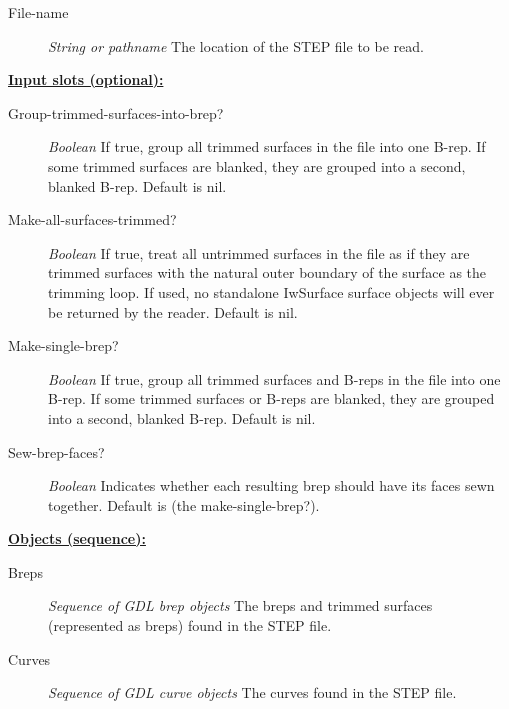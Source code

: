 \documentclass [11pt]{book}
\begin{document}
\begin{itemize}
\begin{description}
\item [File-name]
\emph{String or pathname} The location of the STEP file to be read.


\end{description}






\textbf{
\underline{Input slots (optional):}}

\begin{description}

\item [Group-trimmed-surfaces-into-brep?]
\emph{Boolean} If true, group all trimmed surfaces in the file into one B-rep.
If some trimmed surfaces are blanked, they are grouped into a second, blanked B-rep. Default is nil.


\item [Make-all-surfaces-trimmed?]
\emph{Boolean} If true, treat all untrimmed surfaces in the file as if they are trimmed surfaces with
the natural outer boundary of the surface as the trimming loop.  If used, no standalone IwSurface surface objects
will ever be returned by the reader.  Default is nil.


\item [Make-single-brep?]
\emph{Boolean} If true, group all trimmed surfaces and B-reps in the file into one B-rep.
If some trimmed surfaces or B-reps are blanked, they are grouped into a second, blanked B-rep. Default is nil.


\item [Sew-brep-faces?]
\emph{Boolean} Indicates whether each resulting brep should have its faces sewn together. Default is (the make-single-brep?).


\end{description}






\textbf{
\underline{Objects (sequence):}}

\begin{description}

\item [Breps]
\emph{Sequence of GDL brep objects} The breps and trimmed surfaces (represented as breps) found in the STEP file.


\item [Curves]
\emph{Sequence of GDL curve objects} The curves found in the STEP file.



\end{description}
\end{itemize}
\end{document}
